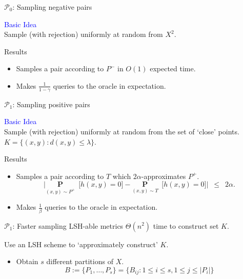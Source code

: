 \documentclass{beamer}
\newcommand{\mc}{\mathcal}
\newcommand{\mb}{\mathbf}
\begin{document}
\begin{frame}{$\mc P_0$: Sampling negative pairs}
	
	\vspace{10pt}\textcolor{blue}{Basic Idea}\\
	Sample (with rejection) uniformly at random from $X^2$. 
	
	\vspace{20pt}\begin{block}{Results}
		\begin{itemize}
			\vspace{5pt}\item Samples a pair according to $P^-$ in $O(1)$ expected time.
			\vspace{10pt}\item Makes $\frac{1}{1-\gamma}$ queries to the oracle in expectation. 
		\end{itemize}			
	\end{block}
	
	
\end{frame}

\begin{frame}{$\mc P_1$: Sampling positive pairs}
	
	\vspace{20pt}\textcolor{blue}{Basic Idea}\\
	Sample (with rejection) uniformly at random from the set of `close' points. $K = \{(x, y): d(x, y) \le \lambda\}$. 

	\vspace{10pt}\begin{block}{Results}
		\begin{itemize}
			\vspace{5pt}\item Samples a pair according to $T$ which $2\alpha$-approximates $P^+$.
			$$\Big|\underset{(x, y) \sim P^+}{\mb P}\enspace \big[ h(x, y) = 0 ] - \underset{(x, y) \sim T}{\mb P}\enspace \big[ h(x, y) = 0 ]\Big|  \enspace \le \enspace 2\alpha.$$ 
			\vspace{5pt}\item Makes $\frac{1}{\beta}$ queries to the oracle in expectation. 
		\end{itemize}			
	\end{block}
\end{frame}

\begin{frame}{$\mc P_1$: Faster sampling LSH-able metrics}
		\vspace{20pt}\alert{$\Theta(n^2)$} time to construct set $K$.	

	\vspace{20pt}Use an LSH scheme to `approximately construct' $K$.
 	\begin{itemize}
		\vspace{5pt}\item Obtain $s$ different partitions of $X$.
		$$ B := \{P_1, \ldots, P_s\} = \{B_{ij} : 1\le i\le s, 1\le j \le |P_i|\}$$
	\end{itemize}	
\end{frame}
\end{document}
